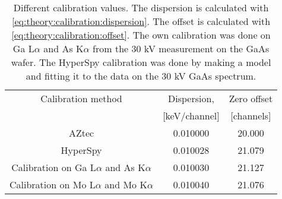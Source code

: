 \begin{table}[hb]
    \centering
    \caption{
        Different calibration values.
        The dispersion is calculated with \cref{eq:theory:calibration:dispersion}.
        The offset is calculated with \cref{eq:theory:calibration:offset}.
        The own calibration was done on Ga L$\alpha$ and As K$\alpha$ from the 30 kV measurement on the GaAs wafer.
        The HyperSpy calibration was done by making a model and fitting it to the data on the 30 kV GaAs spectrum.
    }
    \label{tab:results:calibrations}
    \begin{tabular}{ccc}
        Calibration method                           & Dispersion,   & Zero offset \\
                                                     & [keV/channel] & [channels]  \\
        \hline
        AZtec                                        & 0.010000      & 20.000      \\
        HyperSpy                                     & 0.010028      & 21.079      \\
        Calibration on Ga L$\alpha$ and As K$\alpha$ & 0.010030      & 21.127      \\
        Calibration on Mo L$\alpha$ and Mo K$\alpha$ & 0.010040      & 21.076
    \end{tabular}
\end{table}

